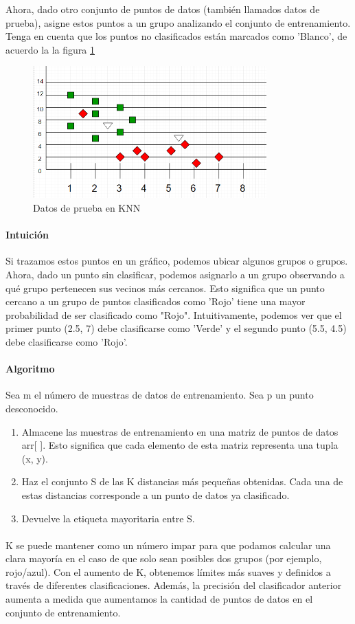 Ahora, dado otro conjunto de puntos de datos (también llamados datos de prueba), asigne estos puntos a un grupo analizando el conjunto de entrenamiento. Tenga en cuenta que los puntos no clasificados están marcados como 'Blanco', de acuerdo la la figura \ref{fig:knn_02}

\begin{figure}[h!]
	\begin{center}
	\includegraphics[angle=0,width=9cm]{Graficos/knn_02.png}
	\caption{Datos de prueba en KNN}
	\label{fig:knn_02}
  \end{center}
\end{figure}

\paragraph{Intuición}
Si trazamos estos puntos en un gráfico, podemos ubicar algunos grupos o grupos. Ahora, dado un punto sin clasificar, podemos asignarlo a un grupo observando a qué grupo pertenecen sus vecinos más cercanos. Esto significa que un punto cercano a un grupo de puntos clasificados como 'Rojo' tiene una mayor probabilidad de ser clasificado como "Rojo".
Intuitivamente, podemos ver que el primer punto (2.5, 7) debe clasificarse como 'Verde' y el segundo punto (5.5, 4.5) debe clasificarse como 'Rojo'.

\paragraph{Algoritmo}
Sea m el número de muestras de datos de entrenamiento. Sea p un punto desconocido.
\begin{enumerate}
	\item Almacene las muestras de entrenamiento en una matriz de puntos de datos arr[ ]. Esto significa que cada elemento de esta matriz representa una tupla (x, y).
	\item Haz el conjunto S de las K distancias más pequeñas obtenidas. Cada una de estas distancias corresponde a un punto de datos ya clasificado.
	\item Devuelve la etiqueta mayoritaria entre S.
\end{enumerate}

\paragraph{}
K se puede mantener como un número impar para que podamos calcular una clara mayoría en el caso de que solo sean posibles dos grupos (por ejemplo, rojo/azul). Con el aumento de K, obtenemos límites más suaves y definidos a través de diferentes clasificaciones. Además, la precisión del clasificador anterior aumenta a medida que aumentamos la cantidad de puntos de datos en el conjunto de entrenamiento.
